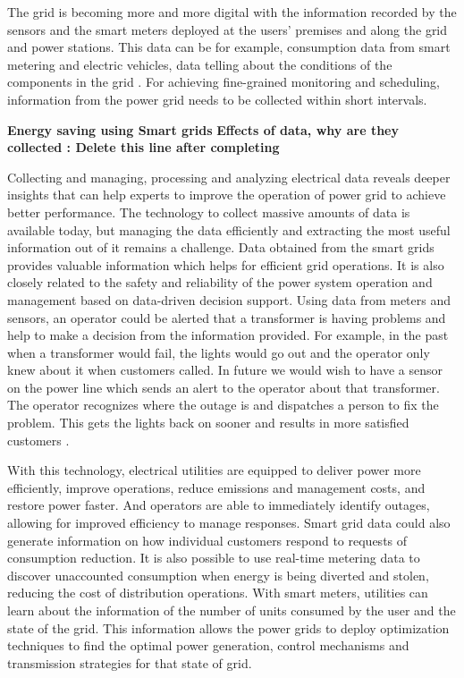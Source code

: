 The grid is becoming more and more digital with the information recorded by the sensors and the smart meters deployed at the users' premises and along the grid and power stations. This data can be for example, consumption data from smart metering and electric vehicles, data telling about the conditions of the components in the grid \cite{aiello2014smart}. For achieving fine-grained monitoring and scheduling, information from the power grid needs to be collected within short intervals. 

\textbf{Energy saving using Smart grids}
\textbf{Effects of data, why are they collected : Delete this line after completing}

Collecting and managing, processing and analyzing electrical data reveals deeper insights that can help experts to improve the operation of power grid to achieve better performance. The technology to collect massive amounts of data is available today, but managing the data efficiently and extracting the most useful information out of it remains a challenge. Data obtained from the smart grids provides valuable information which helps for efficient grid operations. It is also closely related to the safety and reliability of the power system operation and management based on data-driven decision support. Using data from meters and sensors, an operator could be alerted that a transformer is having problems and help to make a decision from the information provided. For example, in the past when a transformer would fail, the lights would go out and the operator only knew about it when customers called. In future we would wish to have a sensor on the power line which sends an alert to the operator about that transformer. The operator recognizes where the outage is and dispatches a person to fix the problem. This gets the lights back on sooner and results in more satisfied customers \cite{Troiano}. 

With this technology, electrical utilities are equipped to deliver power more efficiently, improve operations, reduce emissions and management costs, and restore power faster. And operators are able to immediately identify outages, allowing for improved efficiency to manage responses. Smart grid data could also generate information on how individual customers respond to requests of consumption reduction. It is also possible to use real-time metering data to discover unaccounted consumption when energy is being diverted and stolen, reducing the cost of distribution operations. With smart meters, utilities can learn about the information of the number of units consumed by the user and the state of the grid. This information allows the power grids to deploy optimization techniques to find the optimal power generation, control mechanisms and transmission strategies for that state of grid.


